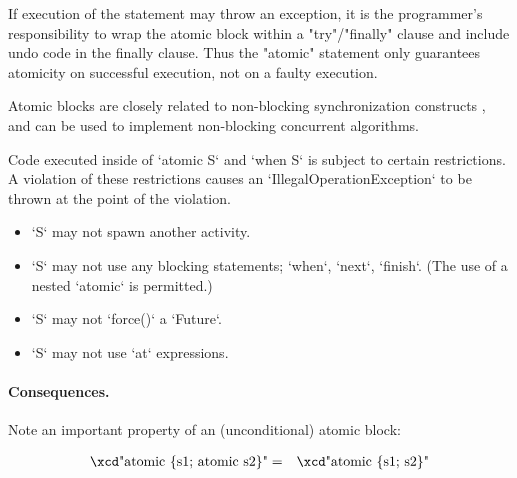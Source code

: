 If execution of the statement may throw an exception, it is
the programmer's responsibility to wrap the atomic block within a
\xcd"try"/\xcd"finally" clause and include undo code in the finally
clause. Thus the \xcd"atomic" statement only guarantees atomicity on
successful execution, not on a faulty execution.




Atomic blocks are closely related to non-blocking synchronization
constructs \cite{herlihy91waitfree}, and can be used to implement 
non-blocking concurrent algorithms.

Code executed inside of \xcd`atomic S` and \xcd`when S` is subject
to certain restrictions. A violation of these restrictions causes an 
\xcd`IllegalOperationException` to be thrown at the point of the violation.

\begin{itemize}
\item \xcd`S` may not spawn another activity.
\item \xcd`S` may not use any blocking statements; \xcd`when`, \xcd`next`,
      \xcd`finish`.  (The use of a nested \xcd`atomic` is permitted.)
\item \xcd`S` may not \xcd`force()` a \xcd`Future`. 
\item \xcd`S` may not use \xcd`at` expressions.
\end{itemize}



\paragraph{Consequences.}
Note an important property of an (unconditional) atomic block:

\begin{eqnarray}
 \mbox{\xcd"atomic \{s1; atomic s2\}"} &=& \mbox{\xcd"atomic \{s1; s2\}"}
\end{eqnarray}

